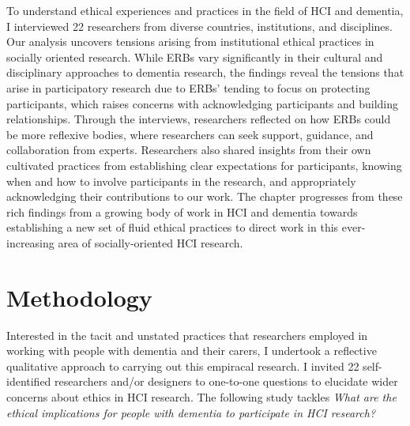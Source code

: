 To understand ethical experiences and practices in the field of HCI and dementia, I interviewed 22 researchers from diverse countries, institutions, and disciplines. Our analysis uncovers tensions arising from institutional ethical practices in socially oriented research. While ERBs vary significantly in their cultural and disciplinary approaches to dementia research, the findings reveal the tensions that arise in participatory research due to ERBs’ tending to focus on protecting participants, which raises concerns with acknowledging participants and building relationships. Through the interviews, researchers reflected on how ERBs could be more reflexive bodies, where researchers can seek support, guidance, and collaboration from experts. Researchers also shared insights from their own cultivated practices from establishing clear expectations for participants, knowing when and how to involve participants in the research, and appropriately acknowledging their contributions to our work. The chapter progresses from these rich findings from a growing body of work in HCI and dementia towards establishing a new set of fluid ethical practices to direct work in this ever-increasing area of socially-oriented HCI research. 

\section{Methodology}
\label{Ethics:Methodology}
Interested in the tacit and unstated practices that researchers employed in working with people with dementia and their carers, I undertook a reflective qualitative approach to carrying out this empiracal research. I invited 22 self-identified researchers and/or designers to one-to-one questions to elucidate wider concerns about ethics in HCI research. The following study tackles \textit{What are the ethical implications for people with dementia to participate in HCI research?}

